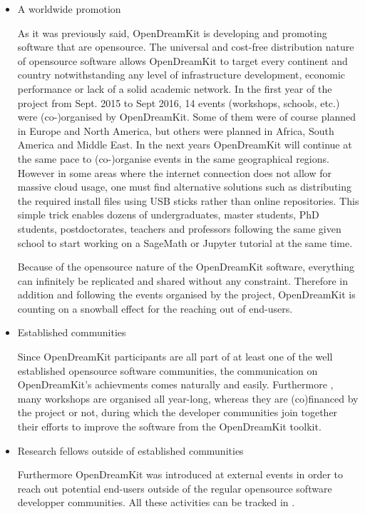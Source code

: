 \documentclass{deliverablereport}
\begin{document}
\begin{itemize}
\item{A worldwide promotion}

As it was previously said, OpenDreamKit is developing and promoting software that are opensource. The universal and cost-free distribution nature of opensource software allows OpenDreamKit to target every continent and country notwithstanding any level of infrastructure development, economic performance or lack of a solid academic network.
In the first year of the project from Sept. 2015 to Sept 2016, 14 events (workshops, schools, etc.) were (co-)organised by OpenDreamKit. Some of them were of course planned in Europe and North America, but others were planned in Africa, South America and Middle East. In the next years OpenDreamKit will continue at the same pace to (co-)organise events in the same geographical regions.
However in some areas where the internet connection does not allow for massive cloud usage, one must find alternative solutions such as distributing the required install files using USB sticks  rather than online repositories. This simple trick enables dozens of undergraduates, master students, PhD students, postdoctorates, teachers and professors following the same given school to start working on a SageMath or Jupyter tutorial at the same time.

Because of the opensource nature of the OpenDreamKit software, everything can infinitely be replicated and shared without any constraint. Therefore in addition and following the events organised by the project, OpenDreamKit is counting on a snowball effect for the reaching out of end-users.




\item{Established communities}

Since OpenDreamKit participants are all part of at least one of the well established opensource software communities, the communication on OpenDreamKit's achievments comes naturally and easily. Furthermore , many workshops are organised all year-long, whereas they are (co)financed by the project or not, during which the developer communities join together their efforts to improve the software from the OpenDreamKit toolkit. 

\item{Research fellows outside of established communities}

Furthermore OpenDreamKit was introduced at external events in order to reach out potential end-users outside of the regular opensource software developper communities.
All these activities can be tracked in . 

\end{itemize}
\end{document}

